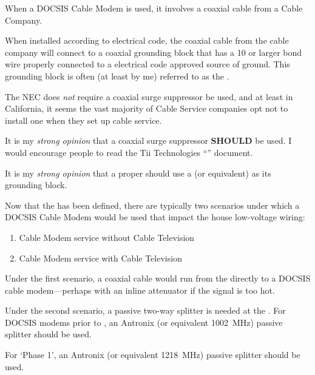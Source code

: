 When a DOCSIS Cable Modem is used, it involves a coaxial cable from a Cable Company.

When installed according to electrical code, the coaxial cable from the cable company will connect to a coaxial
grounding block that has a \qty{10}{\awg} or larger bond wire properly connected to a electrical code
approved source of ground. This grounding block is often (at least by me) referred to as the
.

The NEC does \emph{not} require a coaxial surge suppressor be used, and at least in California, it
seems the vast majority of Cable Service companies opt not to install one when they set up cable service.

It is my \emph{strong opinion} that a coaxial surge suppressor \textbf{SHOULD} be used. I would encourage
people to read the Tii Technologies
``'' document.

It is my \emph{strong opinion} that a proper  should use a
(or equivalent) as its grounding block.

Now that the  has been defined, there are typically two scenarios under
which a DOCSIS Cable Modem would be used that impact the house low-voltage wiring:

\begin{enumerate}
  \item Cable Modem service without Cable Television
  \item Cable Modem service with Cable Television
\end{enumerate}

Under the first scenario, a coaxial cable would run from the  directly to a
DOCSIS cable modem---perhaps with an inline attenuator if the signal is too hot.

Under the second scenario, a passive two-way splitter is needed at the .
For DOCSIS modems prior to , an Antronix
 (or equivalent \qty{1002}{\mega\hertz})
passive splitter should be used.

For  `Phase 1', an Antronix
 (or equivalent \qty{1218}{\mega\hertz})
passive splitter should be used.

